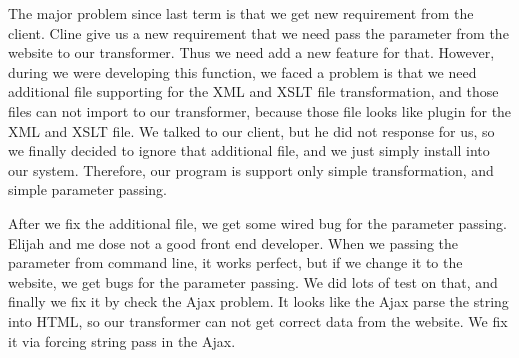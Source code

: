 The major problem since last term is that we get new requirement from the client.
Cline give us a new requirement that we need pass the parameter from the website to our transformer.
Thus we need add a new feature for that.
However, during we were developing this function, we faced a problem is that we need additional file supporting for the XML and XSLT file transformation, and those files can not import to our transformer, because those file looks like plugin for the XML and XSLT file.
We talked to our client, but he did not response for us, so we finally decided to ignore that additional file, and we just simply install into our system.
Therefore, our program is support only simple transformation, and simple parameter passing.

After we fix the additional file, we get some wired bug for the parameter passing.
Elijah and me dose not a good front end developer.
When we passing the parameter from command line, it works perfect, but if we change it to the website, we get bugs for the parameter passing.
We did lots of test on that, and finally we fix it by check the Ajax problem.
It looks like the Ajax parse the string into HTML, so our transformer can not get correct data from the website.
We fix it via forcing string pass in the Ajax.

